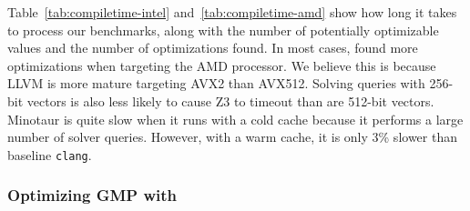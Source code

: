 Table~\ref{tab:compiletime-intel} and~\ref{tab:compiletime-amd} show
how long it takes \minotaur{} to process our benchmarks, along with
the number of potentially optimizable values and the number of
optimizations found.
%
In most cases, \minotaur{} found more optimizations when targeting the AMD
processor.
%
We believe this is because LLVM is more mature targeting
AVX2 than AVX512.
%
Solving queries with 256-bit vectors is also less likely to cause Z3
to timeout than are 512-bit vectors.
%
Minotaur is quite slow when it runs with a cold cache because it
performs a large number of solver queries.
%
However, with a warm cache, it is only 3\% slower than baseline \texttt{clang}.



\subsubsection{Optimizing GMP with \minotaur{}}

